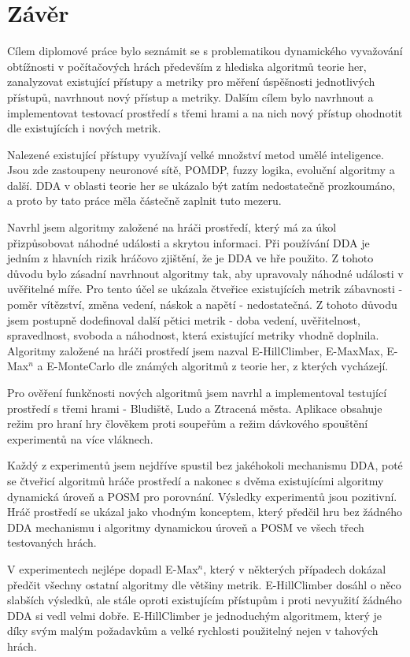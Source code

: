 \chapter{Závěr}

Cílem diplomové práce bylo seznámit se s problematikou dynamického vyvažování obtížnosti v počítačových hrách především z hlediska algoritmů teorie her, zanalyzovat existující přístupy a metriky pro měření úspěšnosti jednotlivých přístupů, navrhnout nový přístup a metriky. Dalším cílem bylo navrhnout a implementovat testovací prostředí s třemi hrami a na nich nový přístup ohodnotit dle existujících i nových metrik. 

Nalezené existující přístupy využívají velké množství metod umělé inteligence. Jsou zde zastoupeny neuronové sítě, POMDP, fuzzy logika, evoluční algoritmy a další. DDA v oblasti teorie her se ukázalo být zatím nedostatečně prozkoumáno, a proto by tato práce měla částečně zaplnit tuto mezeru.

Navrhl jsem algoritmy založené na hráči prostředí, který má za úkol přizpůsobovat náhodné události a skrytou informaci. Při používání DDA je jedním z hlavních rizik hráčovo zjištění, že je DDA ve hře použito. Z tohoto důvodu bylo zásadní navrhnout algoritmy tak, aby upravovaly náhodné události v uvěřitelné míře. Pro tento účel se ukázala čtveřice existujících metrik zábavnosti - poměr vítězství, změna vedení, náskok a napětí - nedostatečná. Z tohoto důvodu jsem postupně dodefinoval další pětici metrik - doba vedení, uvěřitelnost, spravedlnost, svoboda a náhodnost, která existující metriky vhodně doplnila. Algoritmy založené na hráči prostředí jsem nazval E-HillClimber, E-MaxMax, E-Max$^n$ a E-MonteCarlo dle známých algoritmů z teorie her, z kterých vycházejí.

Pro ověření funkčnosti nových algoritmů jsem navrhl a implementoval testující prostředí s třemi hrami - Bludiště, Ludo a Ztracená města. Aplikace obsahuje režim pro hraní hry člověkem proti soupeřům a režim dávkového spouštění experimentů na více vláknech.

Každý z experimentů jsem nejdříve spustil bez jakéhokoli mechanismu DDA, poté se čtveřicí algoritmů hráče prostředí a nakonec s dvěma existujícími algoritmy dynamická úroveň a POSM pro porovnání. Výsledky experimentů jsou pozitivní. Hráč prostředí se ukázal jako vhodným konceptem, který předčil hru bez žádného DDA mechanismu i algoritmy dynamickou úroveň a POSM ve všech třech testovaných hrách. 

V experimentech nejlépe dopadl E-Max$^n$, který v některých případech dokázal předčit všechny ostatní algoritmy dle většiny metrik. E-HillClimber dosáhl o něco slabších výsledků, ale stále oproti existujícím přístupům i proti nevyužití žádného DDA si vedl velmi dobře. E-HillClimber je jednoduchým algoritmem, který je díky svým malým požadavkům a velké rychlosti použitelný nejen v tahových hrách.


